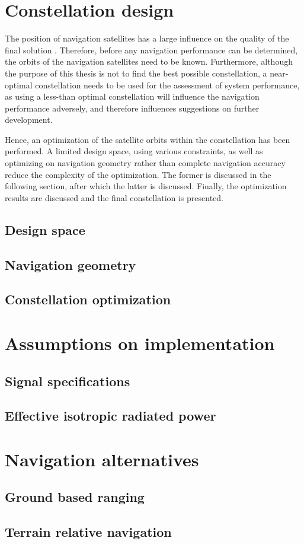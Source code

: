 \section{Constellation design}
The position of navigation satellites has a large influence on the quality of the final solution .
Therefore, before any navigation performance can be determined, the orbits of the navigation satellites need to be known.
Furthermore, although the purpose of this thesis is not to find the best possible constellation, a near-optimal constellation needs to be used for the assessment of system performance, as using a less-than optimal constellation will influence the navigation performance adversely, and therefore influences 
suggestions on further development.

Hence, an optimization of the satellite orbits within the constellation has been performed. A limited design space, using various constraints, as well as optimizing on navigation geometry rather than complete navigation accuracy reduce the complexity of the optimization.
The former is discussed in the following section, after which the latter is discussed.
Finally, the optimization results are discussed and the final constellation is presented.
\subsection{Design space}
\subsection{Navigation geometry}
\subsection{Constellation optimization}

\section{Assumptions on implementation}
\subsection{Signal specifications}
\subsection{Effective isotropic radiated power}

\section{Navigation alternatives}
\subsection{Ground based ranging}
\subsection{Terrain relative navigation}